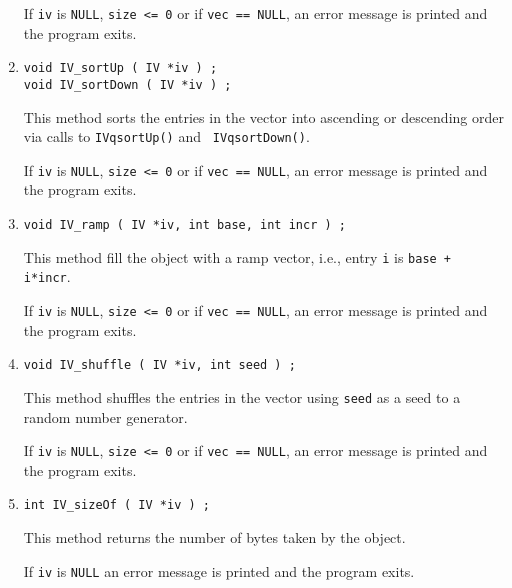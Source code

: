 \begin{enumerate}
\par {}
If {\tt iv} is {\tt NULL}, {\tt size <= 0} or if {\tt vec == NULL}, 
an error message is printed and the program exits.
\item
\begin{verbatim}
void IV_sortUp ( IV *iv ) ;
void IV_sortDown ( IV *iv ) ;
\end{verbatim}
This method sorts the entries in the vector into ascending or
descending order via calls to {\tt IVqsortUp()} and {\tt
IVqsortDown()}.
\par {}
If {\tt iv} is {\tt NULL}, {\tt size <= 0} or if {\tt vec == NULL}, 
an error message is printed and the program exits.
\item
\begin{verbatim}
void IV_ramp ( IV *iv, int base, int incr ) ;
\end{verbatim}
This method fill the object with a ramp vector,
i.e., entry {\tt i} is {\tt base + i*incr}.
\par {}
If {\tt iv} is {\tt NULL}, {\tt size <= 0} or if {\tt vec == NULL}, 
an error message is printed and the program exits.
\item
\begin{verbatim}
void IV_shuffle ( IV *iv, int seed ) ;
\end{verbatim}
This method shuffles the entries in the vector
using {\tt seed} as a seed to a random number generator.
\par {}
If {\tt iv} is {\tt NULL}, {\tt size <= 0} or if {\tt vec == NULL}, 
an error message is printed and the program exits.
\item
\begin{verbatim}
int IV_sizeOf ( IV *iv ) ;
\end{verbatim}
This method returns the number of bytes taken by the object.
\par {}
If {\tt iv} is {\tt NULL}
an error message is printed and the program exits.

\end{enumerate}
